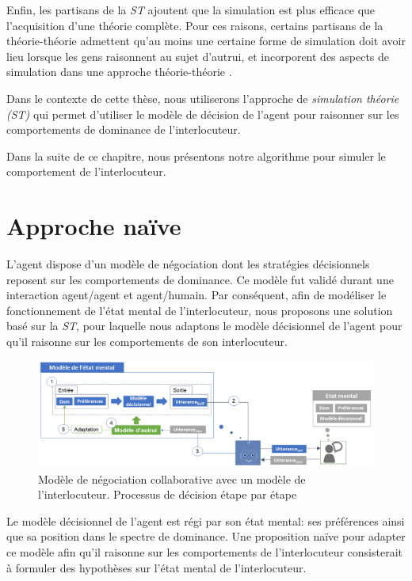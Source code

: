Enfin, les partisans de la \emph{ST} ajoutent que la simulation est plus efficace que l'acquisition d'une théorie complète. Pour ces raisons, certains partisans de la théorie-théorie admettent qu'au moins une certaine forme de simulation doit avoir lieu lorsque les gens raisonnent au sujet d'autrui, et incorporent des aspects de simulation dans une approche théorie-théorie \cite{harbers2012modeling}.

Dans le contexte de cette thèse, nous utiliserons l'approche de \emph{simulation théorie (ST)} qui permet d'utiliser le modèle de décision de l'agent pour raisonner sur les comportements de dominance de l'interlocuteur. 

Dans la suite de ce chapitre, nous présentons notre algorithme pour simuler le comportement de l'interlocuteur.


\section{Approche naïve}
L'agent dispose d'un modèle de négociation dont les stratégies décisionnels reposent sur les comportements de dominance. Ce modèle fut validé durant une interaction agent/agent et agent/humain. Par conséquent, afin de modéliser le fonctionnement de l'état mental de l'interlocuteur, nous proposons une solution basé sur la \emph{ST}, pour laquelle nous adaptons le modèle décisionnel de l'agent pour qu'il raisonne sur les comportements de son interlocuteur. 

\begin{figure}[t]
	\centering
	\includegraphics[width=\linewidth, height=0.2\textheight]{Figures/chap5/model/general.PNG}
	\caption{Modèle de négociation collaborative avec un modèle de l'interlocuteur. Processus de décision étape par étape} 
	\label{fig:schema-general}
\end{figure} 


Le modèle décisionnel de l'agent est régi par son état mental: ses préférences ainsi que sa position dans le spectre de dominance. Une proposition naïve pour adapter ce modèle afin qu'il raisonne sur les comportements de l'interlocuteur consisterait à formuler des hypothèses sur l'état mental de l'interlocuteur. 

